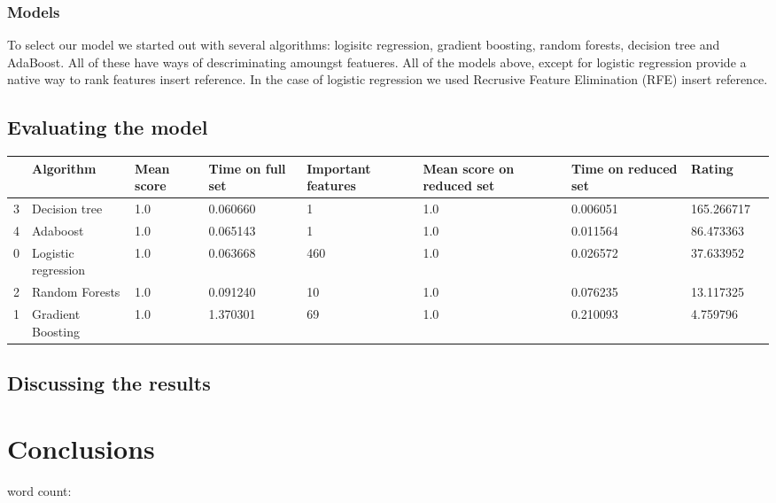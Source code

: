 \documentclass[british]{article}
\begin{document}
\subsubsection{Models}
To select our model we started out with several algorithms: logisitc regression, gradient boosting, random forests, decision tree and AdaBoost. All of these have ways of descriminating amoungst featueres. All of the models above, except for logistic regression provide a native way to rank features {\color{red} insert reference}. In the case of logistic regression we used Recrusive Feature Elimination (RFE){\color{red} insert reference}. 


\subsection{Evaluating the model}
\label{evaluation}
\begin{tabular}{lllllllll}
	\toprule
	{} &            Algorithm &  Mean score &  Time on full set & Important features &  Mean score on reduced set &  Time on reduced set &      Rating \\
	\midrule
	3 &        Decision tree &         1.0 &                                  0.060660 &                            1 &                                1.0 &                                     0.006051 &  165.266717 \\
	4 &             Adaboost &         1.0 &                                  0.065143 &                            1 &                                1.0 &                                     0.011564 &   86.473363 \\
	0 &  Logistic regression &         1.0 &                                  0.063668 &                          460 &                                1.0 &                                     0.026572 &   37.633952 \\
	2 &       Random Forests &         1.0 &                                  0.091240 &                           10 &                                1.0 &                                     0.076235 &   13.117325 \\
	1 &    Gradient Boosting &         1.0 &                                  1.370301 &                           69 &                                1.0 &                                     0.210093 &    4.759796 \\
	\bottomrule
\end{tabular}

\subsection{Discussing the results}
\label{discussion}


\section{Conclusions}
 
 
word count: 
\printbibliography
\end{document}
